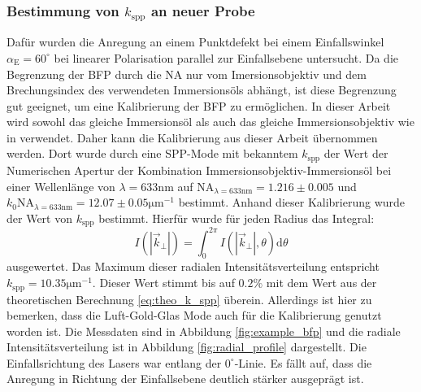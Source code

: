 \documentclass[titlepage]{article}
\begin{document}
		\subsubsection{Bestimmung von  $k_{\mathrm{spp}}$ an neuer Probe}
		Dafür wurden die Anregung an einem Punktdefekt bei einem Einfallswinkel $\alpha_{\mathrm{E}} = 60^\circ$ bei linearer Polarisation parallel zur Einfallsebene untersucht. Da die Begrenzung der BFP durch die NA nur vom Imersionsobjektiv und dem Brechungsindex des verwendeten Immersionsöls abhängt, ist diese Begrenzung gut geeignet, um eine Kalibrierung der BFP zu ermöglichen. In dieser Arbeit wird sowohl das gleiche Immersionsöl als auch das gleiche Immersionsobjektiv wie in\cite{Jaruschewski.2020} verwendet. Daher kann die Kalibrierung aus dieser Arbeit übernommen werden. Dort wurde durch eine SPP-Mode mit bekanntem $k_{\mathrm{spp}}$ der Wert der Numerischen Apertur der Kombination Immersionsobjektiv-Immersionsöl bei einer Wellenlänge von $\lambda=633\mathrm{nm}$ auf $\mathrm{NA}_{\lambda = 633 \mathrm{nm}} = 1.216 \pm 0.005$  und $k_0\mathrm{NA}_{\lambda = 633 \mathrm{nm}} = 12.07 \pm 0.05\mathrm{\mu m}^{-1}$ bestimmt. Anhand dieser Kalibrierung wurde der Wert von $k_{\mathrm{spp}}$ bestimmt. Hierfür wurde für jeden Radius das Integral:
		$$ I\left(|\vec{k}_{\bot}|\right) = \int_{0}^{2 \pi} I\left(|\vec{k}_{\bot}|, \theta\right)\mathrm{d}\theta$$
		ausgewertet. Das Maximum dieser radialen Intensitätsverteilung entspricht $k_{\mathrm{spp}} = 10.35\mathrm{\mu m}^{-1}$.
		 Dieser Wert stimmt bis auf $0.2\%$ mit dem Wert aus der theoretischen Berechnung \eqref{eq:theo_k_spp} überein. Allerdings ist hier zu bemerken, dass die Luft-Gold-Glas Mode auch für die Kalibrierung genutzt worden ist. Die Messdaten sind in Abbildung \ref{fig:example_bfp} und die radiale Intensitätsverteilung ist in Abbildung \ref{fig:radial_profile} dargestellt. Die Einfallsrichtung des Lasers war entlang der $0^\circ$-Linie. Es fällt auf, dass die Anregung in Richtung der Einfallsebene deutlich stärker ausgeprägt ist. 
\end{document}
